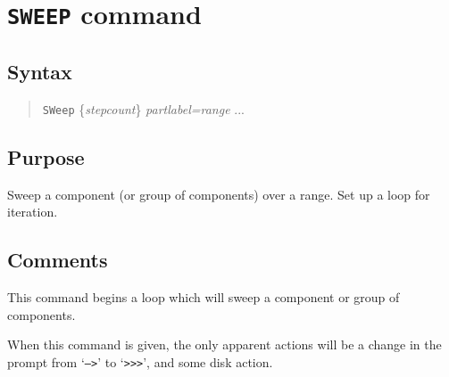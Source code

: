 %
%
%
%
\section{{\tt SWEEP} command}
\subsection{Syntax}
\begin{verse}
{\tt SWeep} \{{\it stepcount}\}  {\it partlabel=range} ...
\end{verse}
\subsection{Purpose}

Sweep a component (or group of components) over a range.  Set up a loop for
iteration.
\subsection{Comments}

This command begins a loop which will sweep a component or group of
components.

When this command is given, the only apparent actions will be a change in the
prompt from `{\tt -->}' to `{\tt >>>}', and some disk action.

